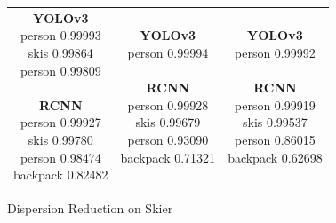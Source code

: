 \documentclass{article}
\begin{document}
\begin{figure}[h]
\begin{tabular}{c c c}
        \makecell[t]{\textbf{YOLOv3} \\ person 0.99993 \\ skis 0.99864 \\ person 0.99809 \\ \\ \textbf{RCNN} \\ person 0.99927 \\ skis 0.99780 \\ person 0.98474 \\ backpack 0.82482} & \makecell[t]{\textbf{YOLOv3} \\ person 0.99994 \\ \\ \textbf{RCNN} \\ person 0.99928 \\ skis 0.99679 \\ person 0.93090 \\ backpack 0.71321 } & \makecell[t]{\textbf{YOLOv3} \\ person 0.99992 \\ \\ \textbf{RCNN} \\ person 0.99919 \\ skis 0.99537 \\ person 0.86015 \\ backpack 0.62698} \\[4.5cm]
    \end{tabular}
\caption{Dispersion Reduction on Skier}
\label{fig:drskier}
\end{figure}
\end{document}
